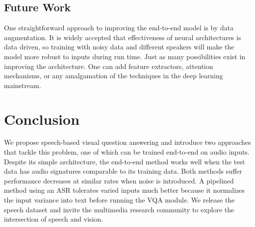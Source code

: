 \documentclass[letterpaper]{article} %
\begin{document}
\subsection{Future Work}

One straightforward approach to improving the end-to-end model is by data augmentation. It is widely accepted that effectiveness of neural architectures is data driven, so training with noisy data and different speakers will make the model more robust to inputs during run time. Just as many possibilities exist in improving the architecture. One can add feature extractors, attention mechanisms, or any amalgamation of the techniques in the deep learning mainstream.

\section{Conclusion}

We propose speech-based visual question answering and introduce two approaches that tackle this problem, one of which can be trained end-to-end on audio inputs. Despite its simple architecture, the end-to-end method works well when the test data has audio signatures comparable to its training data. Both methods suffer performance decreases at similar rates when noise is introduced. A pipelined method using an ASR tolerates varied inputs much better because it normalizes the input variance into text before running the VQA module. We release the speech dataset and invite the multimedia research community to explore the intersection of speech and vision.


 
\end{document}
